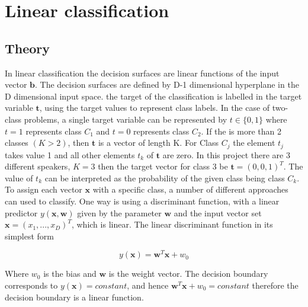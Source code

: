 \chapter{Linear classification}

\section{Theory}

In linear classification the decision surfaces are linear functions of the input vector $\mathbf{b}$. 
The decision surfaces are defined by D-1 dimensional hyperplane in the D dimensional input space.
the target of the classification is labelled in the target variable $\mathbf{t}$, using the target values to represent class labels. 
In the case of two-class problems, a single target variable can be represented by $t\in \lbrace 0,1\rbrace$ where $t = 1$ represents class $C_1$ and $t = 0$ represents class $C_2$.
If the is more than 2 classes $(K>2)$, then $\mathbf{t}$ is a vector of length K.
For Class $C_j$ the element $t_j$ takes value 1 and all other elements $t_k$ of $\mathbf{t}$ are zero.
In this project there are 3 different speakers, $K = 3$ then the target vector for class 3 be $\mathbf{t} = (0, 0, 1)^T$.
The value of $t_k$ can be interpreted as the probability of the given class being class $C_k$.
To assign each vector $\mathbf{x}$ with a specific class, a number of different approaches can used to classify.
One way is using a discriminant function, with a linear predictor $y(\mathbf{x},\mathbf{w})$ given by the parameter $\mathbf{w}$ and the input vector set $\mathbf{x}=(x_1,...,x_D)^T$, which is linear. 
The linear discriminant function in its simplest form

\begin{equation}
y(\mathbf{x}) = \mathbf{w}^T \mathbf{x}+w_0
\label{eq:lineDis}
\end{equation}

Where $w_0$ is the bias and $\mathbf{w}$ is the weight vector.
The decision boundary corresponds to $y(\mathbf{x})=constant$, and hence $\mathbf{w}^T \mathbf{x}+w_0 = constant$ therefore the decision boundary is a linear function.

